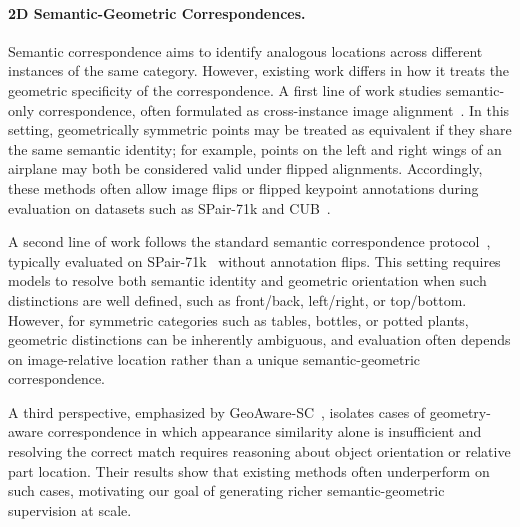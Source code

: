 \paragraph{2D Semantic-Geometric Correspondences.}
Semantic correspondence aims to identify analogous locations across different instances of the same category.
However, existing work differs in how it treats the geometric specificity of the correspondence.
A first line of work studies semantic-only correspondence, often formulated as cross-instance image alignment~\cite{gupta2023asic,ofriamar2023neuralCongealing,Barel:ECCV:2024:SpaceJAM,Hirsch:NeurIPS:2025:FastJAM}.
In this setting, geometrically symmetric points may be treated as equivalent if they share the same semantic identity; for example, points on the left and right wings of an airplane may both be considered valid under flipped alignments.
Accordingly, these methods often allow image flips or flipped keypoint annotations during evaluation on datasets such as SPair-71k and CUB~\cite{min2019spair71k,WahCUB_200_2011}.

A second line of work follows the standard semantic correspondence protocol~\cite{hedlin2023unsupervisedstablediffusion,luo2023DiffusionHyperFeaturesTimeSpace,cho2022cats++,mariotti2024sphericalmap,zhang2023taleTwoFeatures,zhang2024tellingLeftFromRight,cuttano2026marco,wandel2025semalign3d,mariotti2025jamaisvu}, typically evaluated on SPair-71k~\cite{min2019spair71k} without annotation flips.
This setting requires models to resolve both semantic identity and geometric orientation when such distinctions are well defined, such as front/back, left/right, or top/bottom.
However, for symmetric categories such as tables, bottles, or potted plants, geometric distinctions can be inherently ambiguous, and evaluation often depends on image-relative location rather than a unique semantic-geometric correspondence.

A third perspective, emphasized by GeoAware-SC~\cite{zhang2024tellingLeftFromRight}, isolates cases of geometry-aware correspondence in which appearance similarity alone is insufficient and resolving the correct match requires reasoning about object orientation or relative part location. Their results show that existing methods often underperform on such cases, motivating our goal of generating richer semantic-geometric supervision at scale. 

